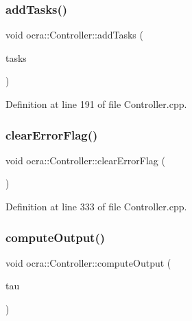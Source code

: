 \subsubsection{\texorpdfstring{add\+Tasks()}{addTasks()}}
{\footnotesize\ttfamily void ocra\+::\+Controller\+::add\+Tasks (\begin{DoxyParamCaption}\item[{const std\+::vector$<$ std\+::shared\+\_\+ptr$<$ \hyperlink{classocra_1_1Task}{Task} $>$$>$ \&}]{tasks }\end{DoxyParamCaption})}



Definition at line 191 of file Controller.\+cpp.

\hypertarget{classocra_1_1Controller_a18fe6c4ad06aa7b2254ab6e4e740d101}{}\label{classocra_1_1Controller_a18fe6c4ad06aa7b2254ab6e4e740d101} 
\subsubsection{\texorpdfstring{clear\+Error\+Flag()}{clearErrorFlag()}}
{\footnotesize\ttfamily void ocra\+::\+Controller\+::clear\+Error\+Flag (\begin{DoxyParamCaption}{ }\end{DoxyParamCaption})}



Definition at line 333 of file Controller.\+cpp.

\hypertarget{classocra_1_1Controller_ada65e72ccb81a7020422268f36d944fe}{}\label{classocra_1_1Controller_ada65e72ccb81a7020422268f36d944fe} 
\subsubsection{\texorpdfstring{compute\+Output()}{computeOutput()}\hspace{0.1cm}{\footnotesize\ttfamily [1/2]}}
{\footnotesize\ttfamily void ocra\+::\+Controller\+::compute\+Output (\begin{DoxyParamCaption}\item[{Eigen\+::\+Vector\+Xd \&}]{tau }\end{DoxyParamCaption})}



